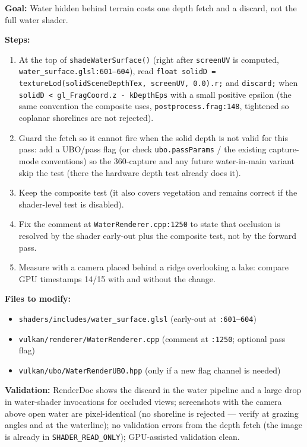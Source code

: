 \documentclass[11pt,a4paper]{article}
\begin{document}
\begin{tcolorbox}[promptbox={Prompt: Reject Solid-Occluded Water Fragments Before Shading}]
\textbf{Goal:} Water hidden behind terrain costs one depth fetch and a discard, not the full water shader.

\textbf{Steps:}
\begin{enumerate}
    \item At the top of \texttt{shadeWaterSurface()} (right after \texttt{screenUV} is computed,
    \texttt{water\_surface.glsl:601--604}), read \texttt{float solidD = textureLod(solidSceneDepthTex, screenUV,
    0.0).r;} and \texttt{discard;} when \texttt{solidD < gl\_FragCoord.z - kDepthEps} with a small positive epsilon
    (the same convention the composite uses, \texttt{postprocess.frag:148}, tightened so coplanar shorelines are not
    rejected).
    \item Guard the fetch so it cannot fire when the solid depth is not valid for this pass: add a UBO/pass flag (or
    check \texttt{ubo.passParams} / the existing capture-mode conventions) so the 360-capture and any future
    water-in-main variant skip the test (there the hardware depth test already does it).
    \item Keep the composite test (it also covers vegetation and remains correct if the shader-level test is disabled).
    \item Fix the comment at \texttt{WaterRenderer.cpp:1250} to state that occlusion is resolved by the shader
    early-out plus the composite test, not by the forward pass.
    \item Measure with a camera placed behind a ridge overlooking a lake: compare GPU timestamps 14/15 with and without
    the change.
\end{enumerate}

\textbf{Files to modify:}
\begin{itemize}
    \item \texttt{shaders/includes/water\_surface.glsl} (early-out at \texttt{:601--604})
    \item \texttt{vulkan/renderer/WaterRenderer.cpp} (comment at \texttt{:1250}; optional pass flag)
    \item \texttt{vulkan/ubo/WaterRenderUBO.hpp} (only if a new flag channel is needed)
\end{itemize}

\textbf{Validation:} RenderDoc shows the discard in the water pipeline and a large drop in water-shader invocations for
occluded views; screenshots with the camera above open water are pixel-identical (no shoreline is rejected --- verify at
grazing angles and at the waterline); no validation errors from the depth fetch (the image is already in
\texttt{SHADER\_READ\_ONLY}); GPU-assisted validation clean.
\end{tcolorbox}
\end{document}
